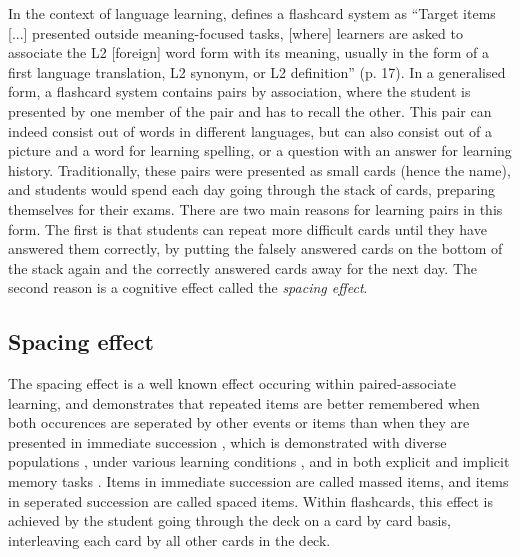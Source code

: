 In the context of language learning,  defines a flashcard system as ``Target items [...] presented outside meaning-focused tasks, [where] learners are asked to associate the L2 [foreign] word form with its meaning, usually in the form of a first language translation, L2 synonym, or L2 definition'' (p. 17). In a generalised form, a flashcard system contains pairs by association, where the student is presented by one member of the pair and has to recall the other. This pair can indeed consist out of words in different languages, but can also consist out of a picture and a word for learning spelling, or a question with an answer for learning history. Traditionally, these pairs were presented as small cards (hence the name), and students would spend each day going through the stack of cards, preparing themselves for their exams. There are two main reasons for learning pairs in this form. The first is that students can repeat more difficult cards until they have answered them correctly, by putting the falsely answered cards on the bottom of the stack again and the correctly answered cards away for the next day. The second reason is a cognitive effect called the \emph{spacing effect}.

\subsection{Spacing effect}

The spacing effect is a well known effect occuring within paired-associate learning, and demonstrates that repeated items are better remembered when both occurences are seperated by other events or items than when they are presented in immediate succession \cite{verkoeijen, logan, siegel, xue, karpicke2}, which is demonstrated with diverse populations \cite{verkoeijen, logan}, under various learning conditions \cite{verkoeijen, logan}, and in both explicit and implicit memory tasks \cite{verkoeijen}. Items in immediate succession are called massed items, and items in seperated succession are called spaced items. Within flashcards, this effect is achieved by the student going through the deck on a card by card basis, interleaving each card by all other cards in the deck. 

